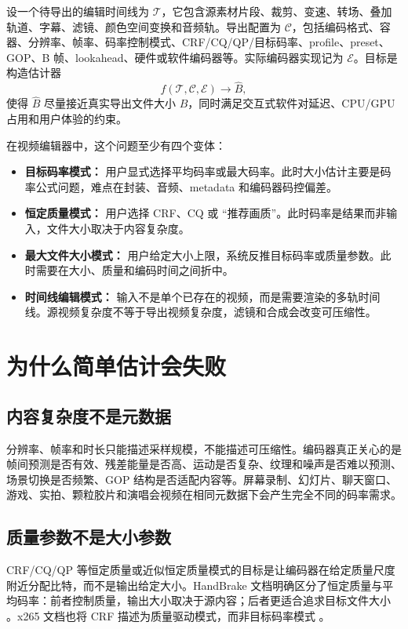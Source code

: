 \documentclass[UTF8,a4paper,11pt]{ctexart}
\begin{document}
设一个待导出的编辑时间线为 $\mathcal{T}$，它包含源素材片段、裁剪、变速、转场、叠加轨道、字幕、滤镜、颜色空间变换和音频轨。导出配置为 $\mathcal{C}$，包括编码格式、容器、分辨率、帧率、码率控制模式、CRF/CQ/QP/目标码率、profile、preset、GOP、B 帧、lookahead、硬件或软件编码器等。实际编码器实现记为 $\mathcal{E}$。目标是构造估计器
\begin{equation}
  f(\mathcal{T}, \mathcal{C}, \mathcal{E}) \rightarrow \hat{B},
\end{equation}
使得 $\hat{B}$ 尽量接近真实导出文件大小 $B$，同时满足交互式软件对延迟、CPU/GPU 占用和用户体验的约束。

在视频编辑器中，这个问题至少有四个变体：

\begin{itemize}
  \item \textbf{目标码率模式：} 用户显式选择平均码率或最大码率。此时大小估计主要是码率公式问题，难点在封装、音频、metadata 和编码器码控偏差。
  \item \textbf{恒定质量模式：} 用户选择 CRF、CQ 或 ``推荐画质''。此时码率是结果而非输入，文件大小取决于内容复杂度。
  \item \textbf{最大文件大小模式：} 用户给定大小上限，系统反推目标码率或质量参数。此时需要在大小、质量和编码时间之间折中。
  \item \textbf{时间线编辑模式：} 输入不是单个已存在的视频，而是需要渲染的多轨时间线。源视频复杂度不等于导出视频复杂度，滤镜和合成会改变可压缩性。
\end{itemize}

\section{为什么简单估计会失败}

\subsection{内容复杂度不是元数据}

分辨率、帧率和时长只能描述采样规模，不能描述可压缩性。编码器真正关心的是帧间预测是否有效、残差能量是否高、运动是否复杂、纹理和噪声是否难以预测、场景切换是否频繁、GOP 结构是否适配内容等。屏幕录制、幻灯片、聊天窗口、游戏、实拍、颗粒胶片和演唱会视频在相同元数据下会产生完全不同的码率需求。

\subsection{质量参数不是大小参数}

CRF/CQ/QP 等恒定质量或近似恒定质量模式的目标是让编码器在给定质量尺度附近分配比特，而不是输出给定大小。HandBrake 文档明确区分了恒定质量与平均码率：前者控制质量，输出大小取决于源内容；后者更适合追求目标文件大小 \cite{handbrake_cq_abr}。x265 文档也将 CRF 描述为质量驱动模式，而非目标码率模式 \cite{x265_cli}。
\end{document}

